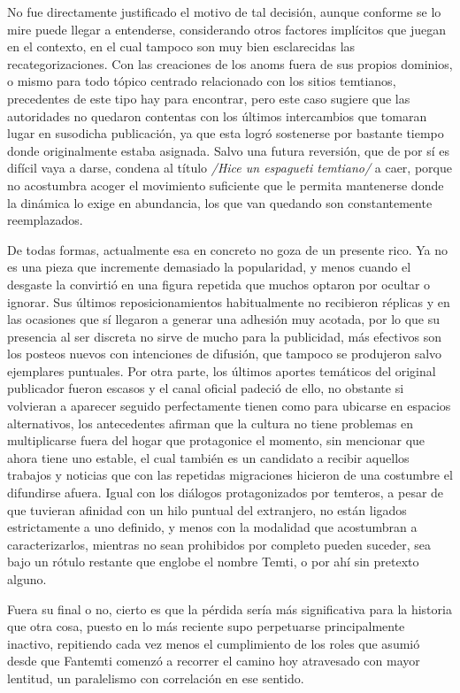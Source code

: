 \documentclass[
]{book}
\begin{document}
No fue directamente justificado el motivo de tal decisión, aunque conforme se lo mire puede llegar a entenderse, considerando otros factores implícitos que juegan en el contexto, en el cual tampoco son muy bien esclarecidas las recategorizaciones. Con las creaciones de los anoms fuera de sus propios dominios, o mismo para todo tópico centrado relacionado con los sitios temtianos, precedentes de este tipo hay para encontrar, pero este caso sugiere que las autoridades no quedaron contentas con los últimos intercambios que tomaran lugar en susodicha publicación, ya que esta logró sostenerse por bastante tiempo donde originalmente estaba asignada. Salvo una futura reversión, que de por sí es difícil vaya a darse, condena al título \emph{/Hice un espagueti temtiano/} a caer, porque no acostumbra acoger el movimiento suficiente que le permita mantenerse donde la dinámica lo exige en abundancia, los que van quedando son constantemente reemplazados.

De todas formas, actualmente esa en concreto no goza de un presente rico. Ya no es una pieza que incremente demasiado la popularidad, y menos cuando el desgaste la convirtió en una figura repetida que muchos optaron por ocultar o ignorar. Sus últimos reposicionamientos habitualmente no recibieron réplicas y en las ocasiones que sí llegaron a generar una adhesión muy acotada, por lo que su presencia al ser discreta no sirve de mucho para la publicidad, más efectivos son los posteos nuevos con intenciones de difusión, que tampoco se produjeron salvo ejemplares puntuales. Por otra parte, los últimos aportes temáticos del original publicador fueron escasos y el canal oficial padeció de ello, no obstante si volvieran a aparecer seguido perfectamente tienen como para ubicarse en espacios alternativos, los antecedentes afirman que la cultura no tiene problemas en multiplicarse fuera del hogar que protagonice el momento, sin mencionar que ahora tiene uno estable, el cual también es un candidato a recibir aquellos trabajos y noticias que con las repetidas migraciones hicieron de una costumbre el difundirse afuera. Igual con los diálogos protagonizados por temteros, a pesar de que tuvieran afinidad con un hilo puntual del extranjero, no están ligados estrictamente a uno definido, y menos con la modalidad que acostumbran a caracterizarlos, mientras no sean prohibidos por completo pueden suceder, sea bajo un rótulo restante que englobe el nombre Temti, o por ahí sin pretexto alguno.

Fuera su final o no, cierto es que la pérdida sería más significativa para la historia que otra cosa, puesto en lo más reciente supo perpetuarse principalmente inactivo, repitiendo cada vez menos el cumplimiento de los roles que asumió desde que Fantemti comenzó a recorrer el camino hoy atravesado con mayor lentitud, un paralelismo con correlación en ese sentido.
\end{document}
